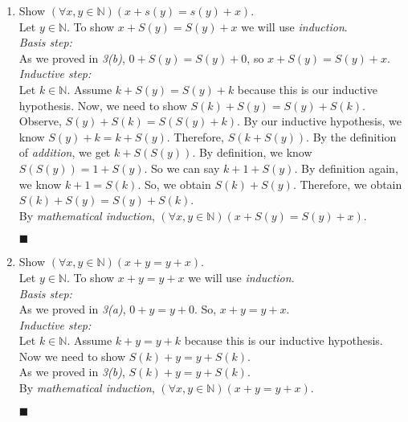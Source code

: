 \documentclass[11pt,a4paper]{article}
\begin{document}
\begin{enumerate}
\begin{enumerate}
        \item 
        Show $(\forall x, y \in \mathbb{N})(x + s(y) = s(y) + x) $. \\
        Let $y \in \mathbb{N} $. To show $x + S(y) = S(y) + x $ we will use \emph{induction}. \\
        \emph{Basis step:} \\
        As we proved in \emph{3(b)}, $0 + S(y) = S(y) + 0 $, so $x + S(y) = S(y) + x$. \\
        \emph{Inductive step:} \\
        Let $k \in \mathbb{N}$. Assume $k + S(y) = S(y) + k $ because this is our inductive hypothesis.
        Now, we need to show $S(k) + S(y) = S(y) + S(k) $. \\
        Observe, $S(y) + S(k) = S(S(y) + k)$. By our inductive hypothesis, we know $S(y) + k = k + S(y) $. Therefore, $S(k + S(y)) $. By the definition of \emph{addition}, we get $k + S(S(y)) $.
        By definition, we know $S(S(y)) = 1 + S(y) $. So we can say $k + 1 + S(y) $. By definition again, we know $k + 1 = S(k) $.
        So, we obtain $S(k) + S(y) $. Therefore, we obtain $S(k) + S(y) = S(y) + S(k) $. \\
        By \emph{mathematical induction}, $(\forall x, y \in \mathbb{N})(x + S(y) = S(y) + x) $.
        \begin{flushright}
            $\blacksquare$
        \end{flushright}

        \item 
        Show $(\forall x, y \in \mathbb{N})(x + y = y + x) $.  \\
        Let $y \in \mathbb{N} $. To show $x + y = y + x $ we will use \emph{induction}. \\
        \emph{Basis step:} \\
        As we proved in \emph{3(a)}, $0 + y = y + 0$. So, $x + y = y + x $. \\
        \emph{Inductive step:} \\
        Let $k \in \mathbb{N}$. Assume $k + y = y + k $ because this is our inductive hypothesis. Now we need to show $S(k) + y = y + S(k) $.  \\
        As we proved in  \emph{3(b)}, $S(k) + y = y + S(k) $. \\
        By \emph{mathematical induction}, $(\forall x, y \in \mathbb{N})(x + y = y + x) $.
        \begin{flushright}
            $\blacksquare$
        \end{flushright}
    \end{enumerate}


\end{enumerate}
\end{document}
